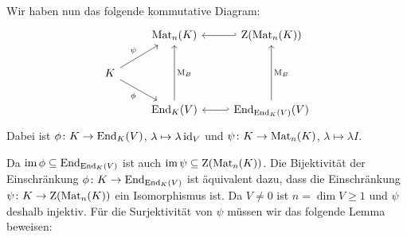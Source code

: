 \documentclass[a4paper, 10pt, numbers=noenddot]{scrartcl}
\begin{document}
Wir haben nun das folgende kommutative Diagram:
\[
  \begin{tikzcd}
      {}
    & \Mat_n(K)
      \arrow[hookleftarrow]{r}
    & \Center(\Mat_n(K))
    \\
      K
      \arrow{ur}{\psi}
      \arrow[swap]{dr}{\phi}
    & {}
    & {}
    \\
      {}
    & \End_K(V)
      \arrow[swap]{uu}{\basismatrix_B}
      \arrow[hookleftarrow]{r}
    & \End_{\End_K(V)}(V)
      \arrow[swap]{uu}{\basismatrix_B}
  \end{tikzcd}
\]
Dabei ist $\phi \colon K \to \operatorname{End}_K(V)$, $\lambda \mapsto \lambda \operatorname{id}_V$ und $\psi \colon K \to \operatorname{Mat}_n(K)$, $\lambda \mapsto \lambda I$.

Da $\operatorname{im} \phi \subseteq \operatorname{End}_{\operatorname{End}_K(V)}$ ist auch $\operatorname{im} \psi \subseteq \operatorname{Z}(\operatorname{Mat}_n(K))$.
Die Bijektivität der Einschränkung $\phi \colon K \to \operatorname{End}_{\operatorname{End}_K(V)}$ ist äquivalent dazu, dass die Einschränkung $\psi \colon K \to \operatorname{Z}(\operatorname{Mat}_n(K))$ ein Isomorphismus ist.
Da $V \neq 0$ ist $n = \dim V \geq 1$ und $\psi$ deshalb injektiv.
Für die Surjektivität von $\psi$ müssen wir das folgende Lemma beweisen:
\end{document}
